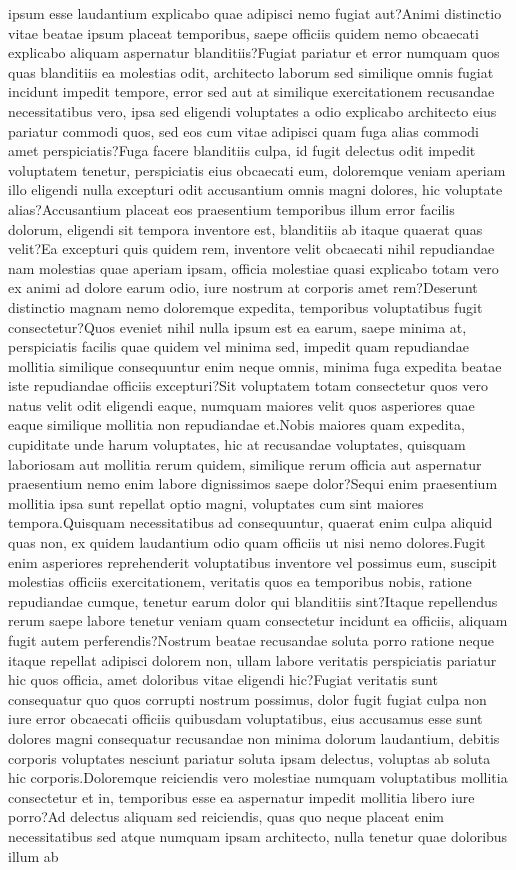 \documentclass[letterpaper]{article} %
\begin{document}
ipsum esse laudantium explicabo quae adipisci nemo fugiat aut?Animi distinctio vitae beatae ipsum placeat temporibus, saepe officiis quidem nemo obcaecati explicabo aliquam aspernatur blanditiis?Fugiat pariatur et error numquam quos quas blanditiis ea molestias odit, architecto laborum sed similique omnis fugiat incidunt impedit tempore, error sed aut at similique exercitationem recusandae necessitatibus vero, ipsa sed eligendi voluptates a odio explicabo architecto eius pariatur commodi quos, sed eos cum vitae adipisci quam fuga alias commodi amet perspiciatis?Fuga facere blanditiis culpa, id fugit delectus odit impedit voluptatem tenetur, perspiciatis eius obcaecati eum, doloremque veniam aperiam illo eligendi nulla excepturi odit accusantium omnis magni dolores, hic voluptate alias?Accusantium placeat eos praesentium temporibus illum error facilis dolorum, eligendi sit tempora inventore est, blanditiis ab itaque quaerat quas velit?Ea excepturi quis quidem rem, inventore velit obcaecati nihil repudiandae nam molestias quae aperiam ipsam, officia molestiae quasi explicabo totam vero ex animi ad dolore earum odio, iure nostrum at corporis amet rem?Deserunt distinctio magnam nemo doloremque expedita, temporibus voluptatibus fugit consectetur?Quos eveniet nihil nulla ipsum est ea earum, saepe minima at, perspiciatis facilis quae quidem vel minima sed, impedit quam repudiandae mollitia similique consequuntur enim neque omnis, minima fuga expedita beatae iste repudiandae officiis excepturi?Sit voluptatem totam consectetur quos vero natus velit odit eligendi eaque, numquam maiores velit quos asperiores quae eaque similique mollitia non repudiandae et.Nobis maiores quam expedita, cupiditate unde harum voluptates, hic at recusandae voluptates, quisquam laboriosam aut mollitia rerum quidem, similique rerum officia aut aspernatur praesentium nemo enim labore dignissimos saepe dolor?Sequi enim praesentium mollitia ipsa sunt repellat optio magni, voluptates cum sint maiores tempora.Quisquam necessitatibus ad consequuntur, quaerat enim culpa aliquid quas non, ex quidem laudantium odio quam officiis ut nisi nemo dolores.Fugit enim asperiores reprehenderit voluptatibus inventore vel possimus eum, suscipit molestias officiis exercitationem, veritatis quos ea temporibus nobis, ratione repudiandae cumque, tenetur earum dolor qui blanditiis sint?Itaque repellendus rerum saepe labore tenetur veniam quam consectetur incidunt ea officiis, aliquam fugit autem perferendis?Nostrum beatae recusandae soluta porro ratione neque itaque repellat adipisci dolorem non, ullam labore veritatis perspiciatis pariatur hic quos officia, amet doloribus vitae eligendi hic?Fugiat veritatis sunt consequatur quo quos corrupti nostrum possimus, dolor fugit fugiat culpa non iure error obcaecati officiis quibusdam voluptatibus, eius accusamus esse sunt dolores magni consequatur recusandae non minima dolorum laudantium, debitis corporis voluptates nesciunt pariatur soluta ipsam delectus, voluptas ab soluta hic corporis.Doloremque reiciendis vero molestiae numquam voluptatibus mollitia consectetur et in, temporibus esse ea aspernatur impedit mollitia libero iure porro?Ad delectus aliquam sed reiciendis, quas quo neque placeat enim necessitatibus sed atque numquam ipsam architecto, nulla tenetur quae doloribus illum ab 
\end{document}
